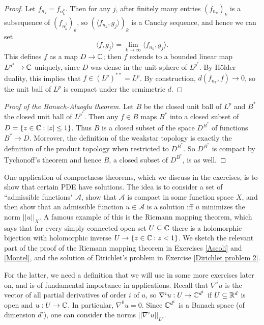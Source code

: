 \begin{proof}
Let $f_{n_k} = f_{n_k^k}$. Then for any $j$, after finitely many entries $(f_{n_k})_k$ is a subsequence of $(f_{n_k^j})_k$, so $(\langle f_{n_k}, g_j\rangle)_k$ is a Cauchy sequence, and hence we can set
$$\langle f, g_j\rangle = \lim_{k \to \infty} \langle f_{n_k}, g_j\rangle.$$
This defines $f$ as a map $D \to \mathbb{C}$; then $f$ extends to a bounded linear map $L^{p^*} \to \mathbb{C}$ uniquely, since $D$ was dense in the unit sphere of $L^{p^*}$.
By H\"older duality, this implies that $f \in (L^p)^{**} = L^p$.
By construction, $d(f_{n_k}, f) \to 0$, so the unit ball of $L^p$ is compact under the semimetric $d$.
\end{proof}

\begin{proof}[Proof of the Banach-Alaoglu theorem]
Let $B$ be the closed unit ball of $L^p$ and $B^*$ the closed unit ball of $L^{p^*}$.
Then any $f \in B$ maps $B^*$ into a closed subset of $D = \{z \in \mathbb{C}: |z| \leq 1\}$.
Thus $B$ is a closed subset of the space $D^{B^*}$ of functions $B^* \to D$.
Moreover, the definition of the weakstar topology is exactly the definition of the product topology when restricted to $D^{B^*}$.
So $D^{B^*}$ is compact by Tychonoff's theorem and hence $B$, a closed subset of $D^{B^*}$, is as well.
\end{proof}

One application of compactness theorems, which we discuss in the exercises, is to show that certain PDE have solutions.
The idea is to consider a set of ``admissible functions" $\mathcal A$, show that $\mathcal A$ is compact in some function space $X$, and then show that an admissible function $u \in \mathcal A$ is a solution iff $u$ minimizes the norm $||u||_X$.
A famous example of this is the Riemann mapping theorem, which says that for every simply connected open set $U \subseteq \mathbb{C}$ there is a holomorphic bijection with holomorphic inverse $U \to \{z \in \mathbb{C}: z < 1\}$.
We sketch the relevant part of the proof of the Riemann mapping theorem in Exercises \ref{Ascoli} and \ref{Montel}, and the solution of Dirichlet's problem in Exercise \ref{Dirichlet problem 2}.

For the latter, we need a definition that we will use in some more exercises later on, and is of fundamental importance in applications.
Recall that $\nabla^iu$ is the vector of all partial derivatives of order $i$ of $u$, so $\nabla^iu: U \to \mathbb{C}^{d^i}$ if $U \subseteq \mathbb{R}^d$ is open and $u: U \to \mathbb{C}$.
In particular, $\nabla^0u = 0$.
Since $\mathbb{C}^{d^i}$ is a Banach space (of dimension $d^i$), one can consider the norms $||\nabla^iu||_{L^p}$.

